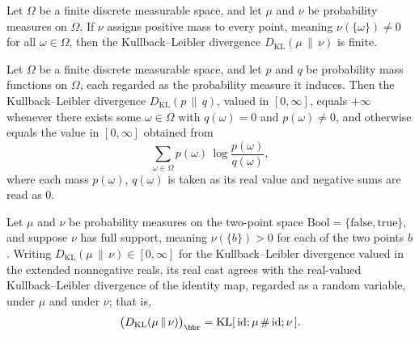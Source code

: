 \begin{theorem}
\label{CommunicationComplexity.FiniteMeasureSpace.klDiv_ne_top_of_forall_toPMF_ne_zero}
\leanok
{}
Let $\Omega$ be a finite discrete measurable space, and let $\mu$ and $\nu$ be
probability measures on $\Omega$. If $\nu$ assigns positive mass to every point, meaning
$\nu(\{\omega\}) \neq 0$ for all $\omega \in \Omega$, then the Kullback–Leibler
divergence $D_{\mathrm{KL}}(\mu \,\|\, \nu)$ is finite.
\end{theorem}

\begin{theorem}
\label{CommunicationComplexity.FiniteMeasureSpace.pmf_klDiv_eq_sum_log}
\leanok
{}
Let $\Omega$ be a finite discrete measurable space, and let $p$ and $q$ be probability
mass functions on $\Omega$, each regarded as the probability measure it induces. Then
the Kullback–Leibler divergence $D_{\mathrm{KL}}(p \,\|\, q)$, valued in $[0,\infty]$,
equals $+\infty$ whenever there exists some $\omega \in \Omega$ with $q(\omega) = 0$ and
$p(\omega) \neq 0$, and otherwise equals the value in $[0,\infty]$ obtained from
\[
  \sum_{\omega \in \Omega} p(\omega)\,\log\!\frac{p(\omega)}{q(\omega)},
\]
where each mass $p(\omega)$, $q(\omega)$ is taken as its real value and negative sums
are read as $0$.
\end{theorem}

\begin{theorem}
\label{ProbabilityTheory.toReal_klDiv_bool_eq_KLDiv}
\leanok
{}
Let $\mu$ and $\nu$ be probability measures on the two-point space $\mathrm{Bool} =
\{\mathrm{false}, \mathrm{true}\}$, and suppose $\nu$ has full support, meaning
$\nu(\{b\}) > 0$ for each of the two points $b$. Writing $D_{\mathrm{KL}}(\mu \,\|\,
\nu) \in [0, \infty]$ for the Kullback–Leibler divergence valued in the extended
nonnegative reals, its real cast agrees with the real-valued Kullback–Leibler divergence
of the identity map, regarded as a random variable, under $\mu$ and under $\nu$; that
is,
\[
  \bigl(D_{\mathrm{KL}}(\mu \,\|\, \nu)\bigr)_{\bbr}
  = \mathrm{KL}[\,\mathrm{id};\mu \,\#\, \mathrm{id};\nu\,].
\]
\end{theorem}


